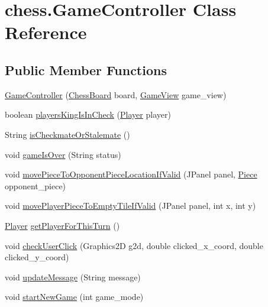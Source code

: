 \hypertarget{classchess_1_1_game_controller}{}\section{chess.\+Game\+Controller Class Reference}
\label{classchess_1_1_game_controller}
\subsection*{Public Member Functions}
\begin{DoxyCompactItemize}
\item 
\hyperlink{classchess_1_1_game_controller_a807721753fe9883b7573eee34f3c8614}{Game\+Controller} (\hyperlink{classchessboard_1_1_chess_board}{Chess\+Board} board, \hyperlink{classchess_1_1_game_view}{Game\+View} game\+\_\+view)
\item 
boolean \hyperlink{classchess_1_1_game_controller_ae38db155ab79e9c899405de2116c6991}{players\+King\+Is\+In\+Check} (\hyperlink{enumchessboard_1_1_player}{Player} player)
\item 
String \hyperlink{classchess_1_1_game_controller_ac6c59b1167b78b3963c7ecdb53f3541b}{is\+Checkmate\+Or\+Stalemate} ()
\item 
void \hyperlink{classchess_1_1_game_controller_abecbe39ba58ba9547d3bdb7c238ef348}{game\+Is\+Over} (String status)
\item 
void \hyperlink{classchess_1_1_game_controller_a7d11340cfe1ebe2af49b5108fcaedd18}{move\+Piece\+To\+Opponent\+Piece\+Location\+If\+Valid} (J\+Panel panel, \hyperlink{classpiece_1_1_piece}{Piece} opponent\+\_\+piece)
\item 
void \hyperlink{classchess_1_1_game_controller_a9305375980a713c74e6515c16ebefbbc}{move\+Player\+Piece\+To\+Empty\+Tile\+If\+Valid} (J\+Panel panel, int x, int y)
\item 
\hyperlink{enumchessboard_1_1_player}{Player} \hyperlink{classchess_1_1_game_controller_a47ff441aae36d704a7a9c9315d61e284}{get\+Player\+For\+This\+Turn} ()
\item 
void \hyperlink{classchess_1_1_game_controller_a978f68fb8834594117aa49b03dbdcf3d}{check\+User\+Click} (Graphics2\+D g2d, double clicked\+\_\+x\+\_\+coord, double clicked\+\_\+y\+\_\+coord)
\item 
void \hyperlink{classchess_1_1_game_controller_af6003c4092b5c51ab7e4e9b064823bfc}{update\+Message} (String message)
\item 
void \hyperlink{classchess_1_1_game_controller_a1922c179d1cf4b115e68a79089f03faa}{start\+New\+Game} (int game\+\_\+mode)

\end{DoxyCompactItemize}
